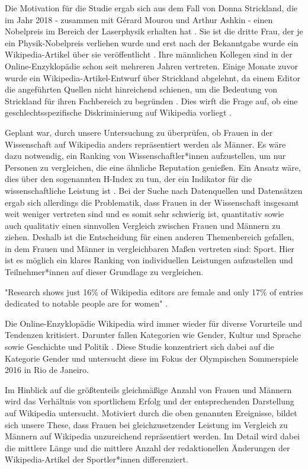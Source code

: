 \documentclass[11pt]{article}
\begin{document}
Die Motivation für die Studie ergab sich aus dem Fall von Donna Strickland, die im Jahr 2018 - zusammen mit Gérard Mourou und Arthur Ashkin - einen Nobelpreis im Bereich der Laserphysik erhalten hat \parencite{nobelprize}. Sie ist die dritte Frau, der je ein Physik-Nobelpreis verliehen wurde und erst nach der Bekanntgabe wurde ein Wikipedia-Artikel über sie veröffentlicht \parencite{Bazely2018}. Ihre männlichen Kollegen sind in der Online-Enzyklopädie schon seit mehreren Jahren vertreten. Einige Monate zuvor wurde ein Wikipedia-Artikel-Entwurf über Strickland abgelehnt, da einem Editor die angeführten Quellen nicht hinreichend schienen, um die Bedeutung von Strickland für ihren Fachbereich zu begründen \parencite{stricklandWiki}. Dies wirft die Frage auf, ob eine geschlechtsspezifische Diskriminierung auf Wikipedia vorliegt \parencite{LeylandCecco}.

Geplant war, durch unsere Untersuchung zu überprüfen, ob Frauen in der Wissenschaft auf Wikipedia anders repräsentiert werden als Männer. Es wäre dazu notwendig, ein Ranking von Wissenschaftler*innen aufzustellen, um nur Personen zu vergleichen, die eine ähnliche Reputation genießen. Ein Ansatz wäre, dies über den sogenannten H-Index zu tun, der ein Indikator für die wissenschaftliche Leistung ist \parencite{hIndex}. Bei der Suche nach Datenquellen und Datensätzen ergab sich allerdings die Problematik, dass Frauen in der Wissenschaft insgesamt weit weniger vertreten sind und es somit sehr schwierig ist, quantitativ sowie auch qualitativ einen sinnvollen Vergleich zwischen Frauen und Männern zu ziehen. Deshalb ist die Entscheidung für einen anderen Themenbereich gefallen, in dem Frauen und Männer in vergleichbaren Maßen vertreten sind: Sport. Hier ist es möglich ein klares Ranking von individuellen Leistungen aufzustellen und Teilnehmer*innen auf dieser Grundlage zu vergleichen.

"Research shows just 16\% of Wikipedia editors are female and only 17\% of entries dedicated to notable people are for women"  \parencite{PoppyNoor}.

Die Online-Enzyklopädie Wikipedia wird immer wieder für diverse Vorurteile und Tendenzen kritisiert. Darunter fallen Kategorien wie Gender, Kultur und Sprache sowie Geschichte und Politik \parencite{PoppyNoor}. Diese Studie konzentriert sich dabei auf die Kategorie Gender und untersucht diese im Fokus der Olympischen Sommerspiele 2016 in Rio de Janeiro.

Im Hinblick auf die größtenteils gleichmäßige Anzahl von Frauen und Männern wird das Verhältnis von sportlichem Erfolg und der entsprechenden Darstellung auf Wikipedia untersucht. Motiviert durch die oben genannten Ereignisse, bildet sich unsere These, dass Frauen bei gleichzusetzender Leistung im Vergleich zu Männern auf Wikipedia unzureichend repräsentiert werden. Im Detail wird dabei die mittlere Länge und die mittlere Anzahl der redaktionellen Änderungen der Wikipedia-Artikel der Sportler*innen differenziert.
\end{document}
